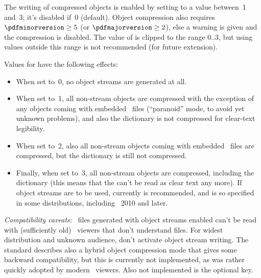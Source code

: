 \documentclass{pdftexmanual}
\begin{document}
The writing of compressed objects is enabled by setting
 to a value between~1 and~3; it's disabled if~0
(default). Object compression also requires
$\mbox{\tt \textbackslash pdfminorversion}\ge5$ (or $\mbox{\tt \textbackslash pdfmajorversion}\ge2$), else
a warning is given and the compression is disabled. The value of
 is clipped to the range $0..3$, but using
values outside this range is not recommended (for future extension).

Values for  have the following effects:

\begin{itemize}
\item When set to~0, no object streams are generated at all.

\item When set to~1,
all non-stream objects are compressed with the exception of any objects
coming with embedded \PDF\ files (``paranoid'' mode, to avoid yet unknown
problems), and also the  dictionary is not compressed for
clear-text legibility.

\item When set to~2, also all non-stream objects coming
with embedded \PDF\ files are compressed, but the  dictionary
is still not compressed.

\item Finally, when set to~3, all non-stream objects
are compressed, including the  dictionary (this means that
the  can't be read as clear text any more). If object streams
are to be used, currently  is recommended,
and is so specified in some distributions, including \TEXLIVE~2010 and later.
\end{itemize}

\emph{Compatibility caveats:} \PDF\ files generated with object
streams enabled can't be read with (sufficiently old) \PDF\ viewers that
don't understand  files. For widest distribution and unknown
audience, don't activate object stream writing. The  standard
describes also a hybrid object compression mode that gives some backward
compatibility, but this is currently not implemented, as  was
rather quickly adopted by modern \PDF\ viewers. Also not implemented is
the optional  key.

\subsection{}
\end{document}
